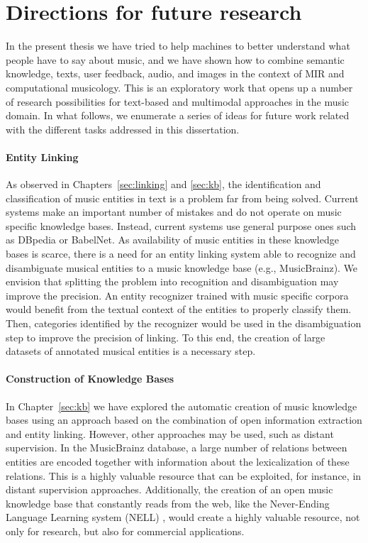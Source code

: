 \section{Directions for future research}
\label{sec:conclusion:future}

In the present thesis we have tried to help machines to better understand what people have to say about music, and we have shown how to combine semantic knowledge, texts, user feedback, audio, and images in the context of MIR and computational musicology. This is an exploratory work that opens up a number of research possibilities for text-based and multimodal approaches in the music domain. In what follows, we enumerate a series of ideas for future work related with the different tasks addressed in this dissertation.

\paragraph{Entity Linking} As observed in Chapters~\ref{sec:linking} and \ref{sec:kb}, the identification and classification of music entities in text is a problem far from being solved. Current systems make an important number of mistakes and do not operate on music specific knowledge bases. Instead, current systems use general purpose ones such as DBpedia or BabelNet. As availability of music entities in these knowledge bases is scarce, there is a need for an entity linking system able to recognize and disambiguate musical entities to a music knowledge base (e.g., MusicBrainz). We envision that splitting the problem into recognition and disambiguation may improve the precision. An entity recognizer trained with music specific corpora would benefit from the textual context of the entities to properly classify them. Then, categories identified by the recognizer would be used in the disambiguation step to improve the precision of linking. To this end, the creation of large datasets of annotated musical entities is a necessary step. %

\paragraph{Construction of Knowledge Bases} In Chapter~\ref{sec:kb} we have explored the automatic creation of music knowledge bases using an approach based on the combination of open information extraction and entity linking. However, other approaches may be used, such as distant supervision. In the MusicBrainz database,  a large number of relations between entities are encoded together with information about the lexicalization of these relations. This is a highly valuable resource that can be exploited, for instance, in distant supervision approaches. Additionally, the creation of an open music knowledge base that constantly reads from the web, like the Never-Ending Language Learning system (NELL) \citep{Carlson2010a}, would create a highly valuable resource, not only for research, but also for commercial applications.

